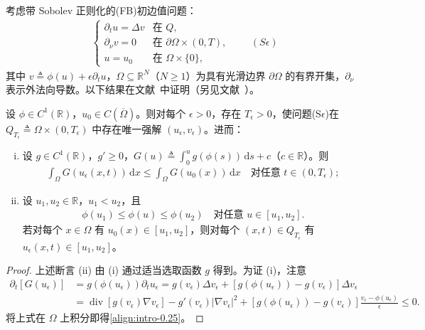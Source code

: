 \documentclass[../main.tex]{subfiles}
\begin{document}
考虑带 Sobolev 正则化的(FB)初边值问题：
\begin{align*}
\begin{cases}
\partial_t u = \Delta v & \text{在 }Q,\\
\partial_\nu v = 0 & \text{在 }\partial\Omega\times(0,T),\\
u=u_0 & \text{在 }\Omega\times\{0\},
\end{cases}
\qquad(S\epsilon)
\end{align*}
其中 $v\triangleq \phi(u)+\epsilon\partial_t u$，$\Omega\subseteq\mathbb{R}^N$（$N\geqslant1$）为具有光滑边界 $\partial\Omega$ 的有界开集，$\partial_\nu$ 表示外法向导数。以下结果在文献~\cite{ref74}中证明（另见文献~\cite{ref76}）。

\begin{lemma}\label{lemma:intro-0.3.1}
设 $\phi\in C^1(\mathbb{R})$，$u_0\in C(\overline\Omega)$。则对每个 $\epsilon>0$，存在 $T_\epsilon>0$，使问题(S$\epsilon$)在 $Q_{T_\epsilon}\triangleq \Omega\times(0,T_\epsilon)$ 中存在唯一强解 $(u_\epsilon,v_\epsilon)$。进而：
\begin{enumerate}[(i)]
\item\label{item:intro-0.3.1-i} 设 $g\in C^1(\mathbb{R})$，$g'\geqslant0$，$G(u)\triangleq \int_0^u g(\phi(s))\,\mathrm{d}s+c$（$c\in\mathbb{R}$）。则
\begin{align}
\int_\Omega G(u_\epsilon(x,t))\,\mathrm{d}x \leqslant \int_\Omega G(u_0(x))\,\mathrm{d}x
\quad \text{对任意 }t\in(0,T_\epsilon); \label{align:intro-0.25}
\end{align}
\item\label{item:intro-0.3.1-ii} 设 $u_1,u_2\in\mathbb{R}$，$u_1<u_2$，且
\begin{align}
\phi(u_1)\leqslant\phi(u)\leqslant\phi(u_2) \quad \text{对任意 }u\in[u_1,u_2]. \label{align:intro-0.26}
\end{align}
若对每个 $x\in\Omega$ 有 $u_0(x)\in[u_1,u_2]$，则对每个 $(x,t)\in Q_{T_\epsilon}$ 有 $u_\epsilon(x,t)\in[u_1,u_2]$。
\end{enumerate}
\end{lemma}

\begin{proof}
上述断言 (ii) 由 (i) 通过适当选取函数 $g$ 得到。为证 (i)，注意
\[
\begin{aligned}
\partial_t[G(u_\epsilon)]
&= g(\phi(u_\epsilon))\partial_t u_\epsilon
= g(v_\epsilon)\Delta v_\epsilon + [g(\phi(u_\epsilon))-g(v_\epsilon)]\Delta v_\epsilon\\
&= \operatorname{div}[g(v_\epsilon)\nabla v_\epsilon] - g'(v_\epsilon)|\nabla v_\epsilon|^2
+ [g(\phi(u_\epsilon))-g(v_\epsilon)]\frac{v_\epsilon-\phi(u_\epsilon)}{\epsilon}
\leqslant 0.
\end{aligned}
\]
将上式在 $\Omega$ 上积分即得\eqref{align:intro-0.25}。
\end{proof}
\end{document}
